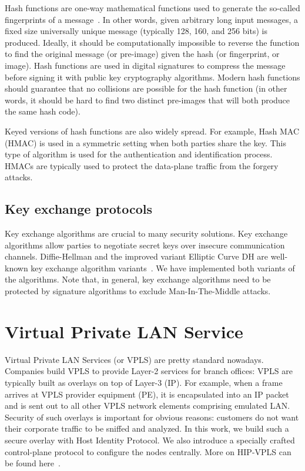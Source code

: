 Hash functions are one-way mathematical functions used to generate the so-called 
fingerprints of a message~\cite{Stinson:Cryptography}. In other words, given arbitrary long input messages, 
a fixed size universally unique message (typically 128, 160, and 256 bits) is produced. 
Ideally, it should be computationally impossible to reverse the function to find the 
original message (or pre-image) given the hash (or fingerprint, or image). Hash functions are used 
in digital signatures to compress the message before signing it with public key 
cryptography algorithms. Modern hash functions should guarantee that no collisions 
are possible for the hash function (in other words, it should be hard to find two 
distinct pre-images that will both produce the same hash code). 

Keyed versions of hash functions are also widely spread. For example, Hash MAC (HMAC) 
is used in a symmetric setting when both parties share the key. This type of algorithm 
is used for the authentication and identification process. HMACs are typically used 
to protect the data-plane traffic from the forgery attacks. 


\subsection{Key exchange protocols}

Key exchange algorithms are crucial to many security solutions. Key exchange algorithms 
allow parties to negotiate secret keys over insecure communication channels. Diffie-Hellman 
and the improved variant Elliptic Curve DH are well-known key exchange algorithm variants~\cite{Stinson:Cryptography}. 
We have implemented both variants of the algorithms. Note that, in general, key exchange 
algorithms need to be protected by signature algorithms to exclude Man-In-The-Middle attacks.

\section{Virtual Private LAN Service}

Virtual Private LAN Services (or VPLS) are pretty standard nowadays. Companies build VPLS to 
provide Layer-2 services for branch offices: VPLS are typically built as overlays on top of 
Layer-3 (IP). For example, when a frame arrives at VPLS provider equipment (PE), it is encapsulated 
into an IP packet and is sent out to all other VPLS network elements comprising emulated LAN. 
Security of such overlays is important for obvious reasons: customers do not want their corporate 
traffic to be sniffed and analyzed. In this work, we build such a secure overlay with Host Identity 
Protocol. We also introduce a specially crafted control-plane protocol to configure the nodes centrally. 
More on HIP-VPLS can be found here~\cite{hipvpls}.

